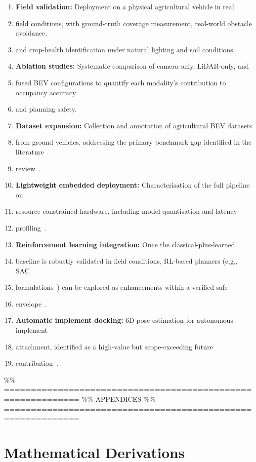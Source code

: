 \documentclass[12pt, a4paper]{article}
\begin{document}
\begin{enumerate}
  \item \textbf{Field validation:} Deployment on a physical agricultural vehicle in real
  \item field conditions, with ground-truth coverage measurement, real-world obstacle avoidance,
  \item and crop-health identification under natural lighting and soil conditions.
  \item \textbf{Ablation studies:} Systematic comparison of camera-only, LiDAR-only, and
  \item fused BEV configurations to quantify each modality's contribution to occupancy accuracy
  \item and planning safety.
  \item \textbf{Dataset expansion:} Collection and annotation of agricultural BEV datasets
  \item from ground vehicles, addressing the primary benchmark gap identified in the literature
  \item review~\cite{ref40}.
  \item \textbf{Lightweight embedded deployment:} Characterisation of the full pipeline on
  \item resource-constrained hardware, including model quantisation and latency
  \item profiling~\cite{ref68, ref71}.
  \item \textbf{Reinforcement learning integration:} Once the classical-plus-learned
  \item baseline is robustly validated in field conditions, RL-based planners (e.g., SAC
  \item formulations~\cite{ref108}) can be explored as enhancements within a verified safe
  \item envelope~\cite{ref129, ref130}.
  \item \textbf{Automatic implement docking:} 6D pose estimation for autonomous implement
  \item attachment, identified as a high-value but scope-exceeding future
  \item contribution~\cite{ref3}.
\end{enumerate}

\%\% ============================================================
\%\% APPENDICES
\%\% ============================================================
\appendix

\chapter{Mathematical Derivations}
\label{app:math}
\end{document}
